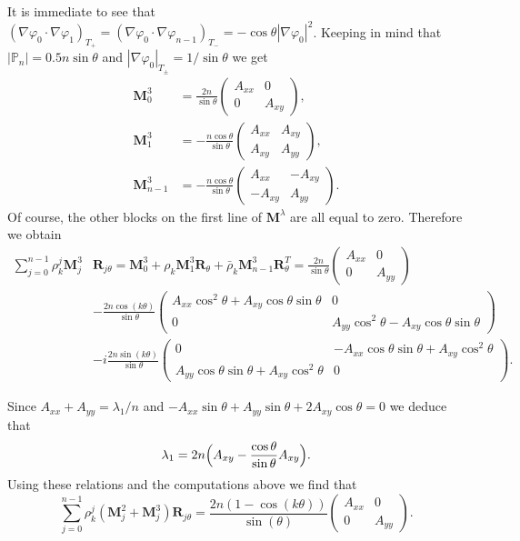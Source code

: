 \documentclass[11pt]{article}
\numberwithin{equation}{section}\newtheorem*{jepEnonce}{\jepEnonceTitle}\newenvironment{enonce*}[1]{\def\jepEnonceTitle{#1}\jepEnonce}{\endjepEnonce}\newtheorem*{conj*}{Conjecture}
\theoremstyle{plain}
\theoremstyle{definition}
\newcommand{\bo}[1]{{\boldsymbol#1}}
\def\Pp{{\mathbb{P}_n}}
\begin{document}
It is immediate to see that $(\nabla \varphi_0\cdot \nabla \varphi_1)_{T_+} = (\nabla \varphi_0 \cdot \nabla \varphi_{n-1})_{T_-} = -\cos \theta |\nabla \varphi_0|^2$. Keeping in mind that $|\Pp| = 0.5 n \sin \theta$ and $|\nabla \varphi_0|_{T_\pm} = 1/\sin \theta$ we get\vspace*{-3pt}
\begin{align*}
\bo M_0^3 &= \frac{2n}{\sin \theta} \begin{pmatrix}
A_{xx} & 0 \\
0 & A_{xy}
\end{pmatrix},\\
\bo M_1^3 &= -\frac{n\cos \theta}{\sin \theta}\begin{pmatrix}
A_{xx} & A_{xy} \\
A_{xy} & A_{yy}
\end{pmatrix},\\
\bo M_{n-1}^3 &= -\frac{n\cos \theta}{\sin \theta} \begin{pmatrix}
A_{xx} & -A_{xy} \\
-A_{xy} & A_{yy}
\end{pmatrix}.
\end{align*}
Of course, the other blocks on the first line of $\bo M^\lambda$ are all equal to zero. Therefore we obtain\vspace*{-3pt}
\begin{align*}
\sum_{j=0}^{n-1} \rho_k^j \bo M_j^3& \bo R_{j\theta} = \bo M_0^3+ \rho_k \bo M_1^3\bo R_\theta+\bar \rho_k \bo M_{n-1}^3 \bo R_\theta^T = \frac{2n}{\sin \theta} \begin{pmatrix}
A_{xx} & 0 \\ 0 & A_{yy}
\end{pmatrix}\\[-3pt]
&-\frac{2n\cos(k\theta)}{\sin \theta}\begin{pmatrix}
A_{xx} \cos^2 \theta+A_{xy} \cos \theta \sin \theta & 0 \\
0 & A_{yy} \cos^2 \theta - A_{xy} \cos \theta \sin \theta
\end{pmatrix}\\
&-i\frac{2n\sin(k\theta)}{\sin \theta}
\begin{pmatrix}
0 & -A_{xx} \cos \theta\sin \theta+ A_{xy}\cos^2 \theta \\
A_{yy} \cos \theta\sin \theta+A_{xy}\cos^2 \theta & 0
\end{pmatrix}.
\end{align*}

Since $A_{xx}+A_{yy}=\lambda_1/n$ and $-A_{xx}\sin \theta+A_{yy}\sin \theta+2A_{xy}\cos \theta=0$ we deduce that\vspace*{-3pt}
\begin{equation}
\lambda_1 = 2n\Bigl(A_{xy}-\frac{\cos\theta}{\sin \theta}A_{xy}\Bigr).
\label{eq:criticality-tplus}
\end{equation}
Using these relations and the computations above we find that
\[
\sum_{j=0}^{n-1} \rho_k^j (\bo M_j^2+\bo M_j^3) \bo R_{j\theta}
= \frac{2n(1-\cos(k\theta))}{\sin(\theta)} \begin{pmatrix}
A_{xx} & 0 \\
0 & A_{yy}
\end{pmatrix}.
\]
\end{document}

